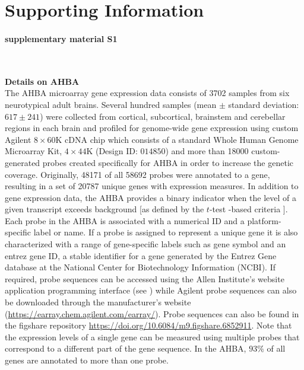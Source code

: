 \documentclass[10pt,A4]{article}
\date{}
\begin{document}
\section*{Supporting Information}

\paragraph*{supplementary material S1}\mbox{}\\
\label{SItext1}

\textbf{Details on AHBA}\\
The AHBA microarray gene expression data consists of \num{3702} samples from six  neurotypical adult brains. Several hundred samples (mean $\pm$ standard deviation: $617 \pm 241$) were collected from cortical, subcortical, brainstem and cerebellar regions in each brain and profiled for genome-wide gene expression using custom Agilent $8\times60$K cDNA chip which consists of a standard Whole Human Genome Microarray Kit, $4\times44$K (Design ID: $014850$) and more than \num{18000} custom-generated probes created specifically for AHBA in order to increase the genetic coverage. Originally, \num{48171} of all \num{58692} probes were annotated to a gene, resulting in a set of \num{20787} unique genes with expression measures. In addition to gene expression data, the AHBA provides a binary indicator when the level of a given transcript exceeds background [as defined by the $t$-test -based criteria \citep{AHBAdoc}].
Each probe in the AHBA is associated with a numerical ID and a platform-specific label or name. If a probe is assigned to represent a unique gene it is also characterized with a range of gene-specific labels such as gene symbol and an entrez gene ID, a stable identifier for a gene generated by the Entrez Gene database at the National Center for Biotechnology Information (NCBI). If required, probe sequences can be accessed using the Allen Institute’s website application programming interface (see ) while Agilent probe sequences can also be downloaded through the manufacturer's website (\url{https://earray.chem.agilent.com/earray/}). Probe sequences can also be found in the figshare repository \url{https://doi.org/10.6084/m9.figshare.6852911}. Note that the expression levels of a single gene can be measured using multiple probes that correspond to a different part of the gene sequence. In the AHBA, $93\%$ of all genes are annotated to more than one probe.
\end{document}
